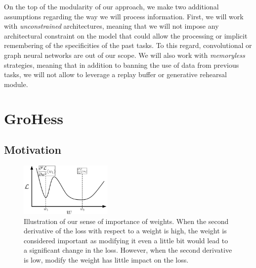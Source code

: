 \documentclass[11pt]{article}
\begin{document}
\vspace{2mm}
\noindent
On the top of the modularity of our approach, we make two additional assumptions regarding the way we will process information. First, we will work with \textit{unconstrained} architectures, meaning that we will not impose any architectural constraint on the model that could allow the processing or implicit remembering of the specificities of the past tasks. To this regard, convolutional or graph neural networks are out of our scope. We will also work with \textit{memoryless} strategies, meaning that in addition to banning the use of data from previous tasks, we will not allow to leverage a replay buffer or generative rehearsal module.




\section{GroHess}



\subsection{Motivation}


\begin{figure}
    \centering
    \includegraphics[width=0.40\textwidth]{images/motivation_GroHess.png}
    \caption{Illustration of our sense of importance of weights. When the second derivative of the loss with respect to a weight is high, the weight is considered important as modifying it even a little bit would lead to a significant change in the loss. However, when the second derivative is low, modify the weight has little impact on the loss.}
    \label{fig:motivation_GroHess}
\end{figure}
\end{document}
